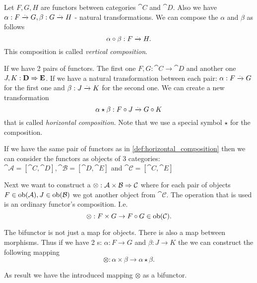 \begin{definition}
\label{def:vertical_composition}
Let $F,G,H$ are functors between categories $\cat{C}$ and $\cat{D}$.
Also we have $\alpha : F \xrightarrow{.} G, \beta: G \xrightarrow{.}
H$ - natural transformations. We can compose the $\alpha$ and $\beta$
as follows 
\[
\alpha \circ \beta: F \xrightarrow{.} H.
\]
This composition
is called \textit{vertical composition}.
\end{definition}

\begin{definition}
\label{def:horizontal_composition}
If we have 2 pairs of functors. The first one $F,G: \cat{C} \to
\cat{D}$ and another one $J,K: \mathbf{D} \Rightarrow \mathbf{E}$. If we have a
natural transformation between each pair: $\alpha : F \xrightarrow{.}
G$ for the first one and $\beta : J \xrightarrow{.}
K$ for the second one. We can create a new transformation
\[
\alpha \star \beta: F \circ J \xrightarrow{.} G \circ K
\] 
that is called \textit{horizontal composition}. Note that we use a
special symbol $\star$ for the composition.
\end{definition}

\begin{remark}
 \label{rem:bifunctor_fun_cat}
If we have the same pair of functors as in
\cref{def:horizontal_composition} then we can consider the functors as
objects of 3 categories: $\cat{\mathcal{A}} = \left[\cat{C},
  \cat{D}\right], \cat{\mathcal{B}} = \left[\cat{D},
  \cat{E}\right]$ and $\cat{\mathcal{C}} = \left[\cat{C},
  \cat{E}\right]$ 

  Next we want to construct a  
  $\otimes: \mathbf{\mathcal{A}} \times \mathbf{\mathcal{B}} \Rightarrow \mathbf{\mathcal{C}}$
  where for each pair of objects $F \in \mathrm{ob}(\mathbf{\mathcal{A}}), J \in
  \mathrm{ob}(\mathbf{\mathcal{B}})$ we got another object from $\cat{\mathcal{C}}$.
  The operation that is used is an ordinary functor's composition.
  I.e.
  \[
  \otimes: F \times G \to F \circ G \in \mathrm{ob}(\mathbf{\mathcal{C}}).
  \]
  
  The bifunctor is not just a map for objects. There is also a map
  between morphisms. Thus if we have 2 s:
  $\alpha : F \to G$ and $\beta : J \to K$ the we can construct the
  following mapping 
  \[
  \otimes: \alpha \times \beta \to \alpha \star \beta.
  \]
  
  As result we have the introduced mapping $\otimes$ as a bifunctor.
\end{remark}

